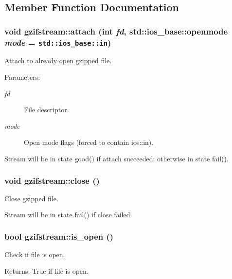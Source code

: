 \subsection{Member Function Documentation}
\subsubsection{\setlength{\rightskip}{0pt plus 5cm}void gzifstream::attach (int {\em fd}, std::ios\_\-base::openmode {\em mode} = {\tt std::ios\_\-base::in})}\label{classgzifstream_954626060566cd297edaa57bade11080}


Attach to already open gzipped file. 

\begin{Desc}
\item[Parameters:]
\begin{description}
\item[{\em fd}]File descriptor. \item[{\em mode}]Open mode flags (forced to contain ios::in).\end{description}
\end{Desc}
Stream will be in state good() if attach succeeded; otherwise in state fail(). 
\subsubsection{\setlength{\rightskip}{0pt plus 5cm}void gzifstream::close ()}\label{classgzifstream_84bbf44aef07eb5c650701ea2f69b9e1}


Close gzipped file. 

Stream will be in state fail() if close failed. 
\subsubsection{\setlength{\rightskip}{0pt plus 5cm}bool gzifstream::is\_\-open ()\hspace{0.3cm}{\tt  [inline]}}\label{classgzifstream_3b46f6141b5424d2745765abb86b23ab}


Check if file is open. 

\begin{Desc}
\item[Returns:]True if file is open. \end{Desc}
